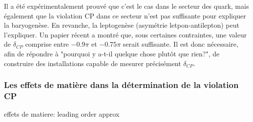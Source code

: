             Il a été expérimentalement prouvé que c'est le cas dans le secteur des quark\cite{Collaboration2006,Charles2004,Kobayashi1973}, mais également que la violation CP dans ce secteur n'est pas suffisante pour expliquer la baryogenèse\cite{Riotto1998}. En revanche, la leptogenèse (asymétrie letpon-antilepton) peut l'expliquer\cite{Davidson2008}. Un papier récent\cite{Buccella2018} a montré que, sous certaines contraintes, une valeur de $\delta_{CP}$ comprise entre $-0.9\pi$ et $-0.75\pi$ serait suffisante. Il est donc nécessaire, afin de répondre à "pourquoi y a-t-il quelque chose plutôt que rien?", de construire des installations capable de mesurer précisément $\delta_{CP}$.
            
            \subsubsection{Les effets de matière dans la détermination de la violation CP}\label{sec::matter-effect-CP}
            
        effets de matiere: \cite{Wolfenstein1978,Mikheyev1986}
        leading order approx \cite{Marciano2006}